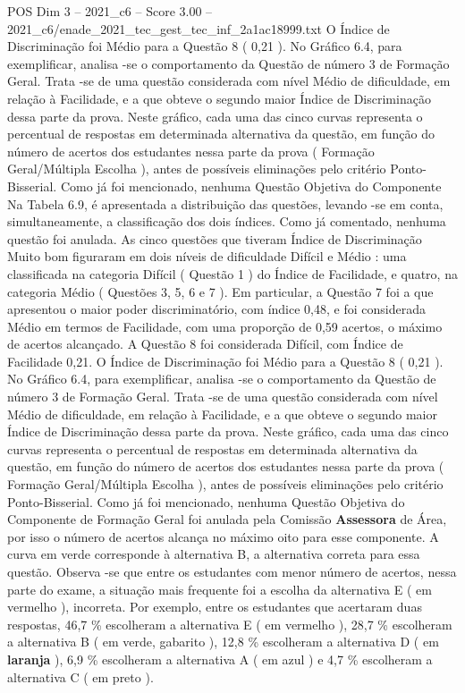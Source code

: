 \begin{textsample}{POS Dim 3 – 2021\_c6 – Score 3.00 – 2021\_c6/enade\_2021\_tec\_gest\_tec\_inf\_2a1ac18999.txt}
O Índice de Discriminação foi Médio para a Questão 8 ( 0,21 ).
No Gráfico 6.4, para exemplificar, analisa -se o comportamento da Questão de número 3 de Formação Geral.
Trata -se de uma questão considerada com nível Médio de dificuldade, em relação à Facilidade, e a que obteve o segundo maior Índice de Discriminação dessa parte da prova.
Neste gráfico, cada uma das cinco curvas representa o percentual de respostas em determinada alternativa da questão, em função do número de acertos dos estudantes nessa parte da prova ( Formação Geral/Múltipla Escolha ), antes de possíveis eliminações pelo critério Ponto-Bisserial.
Como já foi mencionado, nenhuma Questão Objetiva do Componente Na Tabela 6.9, é apresentada a distribuição das questões, levando -se em conta, simultaneamente, a classificação dos dois índices.
Como já comentado, nenhuma questão foi anulada.
As cinco questões que tiveram Índice de Discriminação Muito bom figuraram em dois níveis de dificuldade Difícil e Médio : uma classificada na categoria Difícil ( Questão 1 ) do Índice de Facilidade, e quatro, na categoria Médio ( Questões 3, 5, 6 e 7 ).
Em particular, a Questão 7 foi a que apresentou o maior poder discriminatório, com índice 0,48, e foi considerada Médio em termos de Facilidade, com uma proporção de 0,59 acertos, o máximo de acertos alcançado.
A Questão 8 foi considerada Difícil, com Índice de Facilidade 0,21.
O Índice de Discriminação foi Médio para a Questão 8 ( 0,21 ).
No Gráfico 6.4, para exemplificar, analisa -se o comportamento da Questão de número 3 de Formação Geral.
Trata -se de uma questão considerada com nível Médio de dificuldade, em relação à Facilidade, e a que obteve o segundo maior Índice de Discriminação dessa parte da prova.
Neste gráfico, cada uma das cinco curvas representa o percentual de respostas em determinada alternativa da questão, em função do número de acertos dos estudantes nessa parte da prova ( Formação Geral/Múltipla Escolha ), antes de possíveis eliminações pelo critério Ponto-Bisserial.
Como já foi mencionado, nenhuma Questão Objetiva do Componente de Formação Geral foi anulada pela Comissão \textbf{Assessora} de Área, por isso o número de acertos alcança no máximo oito para esse componente.
A curva em verde corresponde à alternativa B, a alternativa correta para essa questão.
Observa -se que entre os estudantes com menor número de acertos, nessa parte do exame, a situação mais frequente foi a escolha da alternativa E ( em vermelho ), incorreta.
Por exemplo, entre os estudantes que acertaram duas respostas, 46,7 \% escolheram a alternativa E ( em vermelho ), 28,7 \% escolheram a alternativa B ( em verde, gabarito ), 12,8 \% escolheram a alternativa D ( em \textbf{laranja} ), 6,9 \% escolheram a alternativa A ( em azul ) e 4,7 \% escolheram a alternativa C ( em preto ).

\end{textsample}
